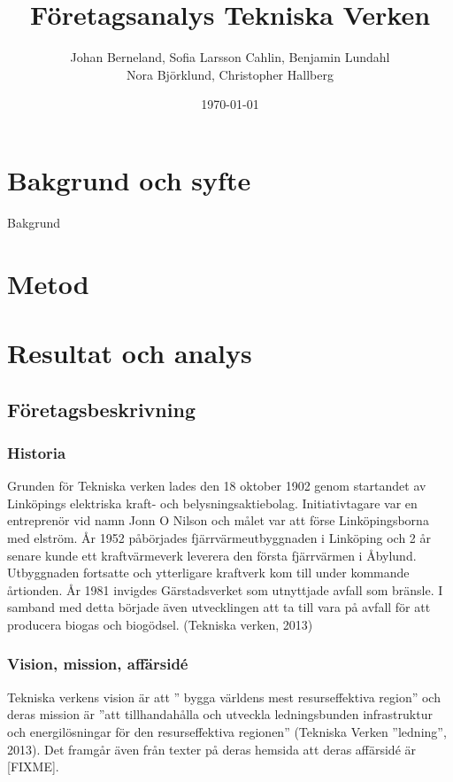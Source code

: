\documentclass[10pt,a4paper]{article}
\title{Företagsanalys Tekniska Verken}
\author{Johan Berneland, Sofia Larsson Cahlin, Benjamin Lundahl \\
    Nora Björklund, Christopher Hallberg}
\date{\today}
\begin{document}
\maketitle

\newpage

\tableofcontents

\newpage

\section{Bakgrund och syfte}
Bakgrund

\section{Metod}

\section{Resultat och analys}
\subsection{Företagsbeskrivning}

\subsubsection{Historia}
Grunden för Tekniska verken lades den 18 oktober 1902 genom startandet av
Linköpings elektriska kraft- och belysningsaktiebolag. Initiativtagare var en
entreprenör vid namn Jonn O Nilson och målet var att förse Linköpingsborna med
elström. År 1952 påbörjades fjärrvärmeutbyggnaden i Linköping och 2 år senare
kunde ett kraftvärmeverk leverera den första fjärrvärmen i Åbylund. Utbyggnaden
fortsatte och ytterligare kraftverk kom till under kommande årtionden. År 1981 
invigdes Gärstadsverket som utnyttjade avfall som bränsle. I samband med detta
började även utvecklingen att ta till vara på avfall för att producera biogas 
och biogödsel. (Tekniska verken, 2013) 
\subsubsection{Vision, mission, affärsidé}
Tekniska verkens vision är att '' bygga världens mest resurseffektiva
region'' och deras mission är ''att tillhandahålla och utveckla
ledningsbunden infrastruktur och energilösningar för den
resurseffektiva regionen'' (Tekniska Verken ''ledning'', 2013). Det framgår även
från texter på deras hemsida att deras affärsidé är [FIXME].
\end{document}
